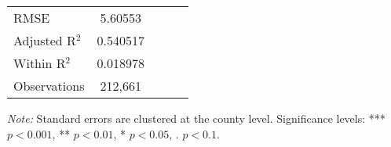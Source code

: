 \documentclass[12pt]{article}
\begin{document}
\begin{table}[h]
\begin{threeparttable}
\begin{adjustbox}{max width=\textwidth}
\begin{tabular}{l c c c c}
					RMSE & 5.60553 & & & \\
					Adjusted R$^2$ & 0.540517 & & & \\
					Within R$^2$ & 0.018978 & & & \\
					Observations & 212,661 & & & \\
					\bottomrule
				\end{tabular}
			\end{adjustbox}
			\begin{tablenotes}
				\item \textit{Note:} Standard errors are clustered at the county level. Significance levels: *** $p<0.001$, ** $p<0.01$, * $p<0.05$, . $p<0.1$. 
			\end{tablenotes}
		\end{threeparttable}
	\end{table}
	\newpage
	
\end{document}
